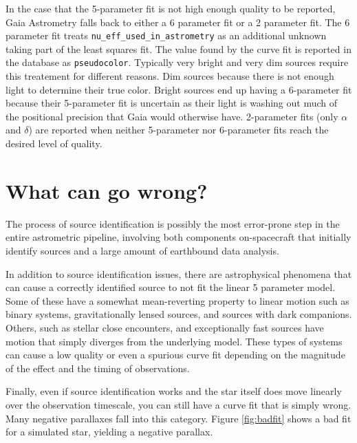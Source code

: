 \documentclass[twocolumn]{aastex631}
\begin{document}
In the case that the 5-parameter fit is not high enough quality to be reported, Gaia Astrometry falls back to either a 6 parameter fit or a 2 parameter fit. The 6 parameter fit treats \texttt{nu\_eff\_used\_in\_astrometry} as an additional unknown taking part of the least squares fit. The value found by the curve fit is reported in the database as \texttt{pseudocolor}. Typically very bright and very dim sources require this treatement for different reasons. Dim sources because there is not enough light to determine their true color. Bright sources end up having a 6-parameter fit because their 5-parameter fit is uncertain as their light is washing out much of the positional precision that Gaia would otherwise have. 2-parameter fits (only $\alpha$ and $\delta$) are reported when neither 5-parameter nor 6-parameter fits reach the desired level of quality.

\section{What can go wrong?} \label{sec:wrong}

The process of source identification is possibly the most error-prone step in the entire astrometric pipeline, involving both components on-spacecraft that initially identify sources and a large amount of earthbound data analysis.

In addition to source identification issues, there are astrophysical phenomena that can cause a correctly identified source to not fit the linear 5 parameter model. Some of these have a somewhat mean-reverting property to linear motion such as binary systems, gravitationally lensed sources, and sources with dark companions. Others, such as stellar close encounters, and exceptionally fast sources have motion that simply diverges from the underlying model. These types of systems can cause a low quality or even a spurious curve fit depending on the magnitude of the effect and the timing of observations. 

Finally, even if source identification works and the star itself does move linearly over the observation timescale, you can still have a curve fit that is simply wrong. Many negative parallaxes fall into this category. Figure \ref{fig:badfit} shows a bad fit for a simulated star, yielding a negative parallax. 
\end{document}
